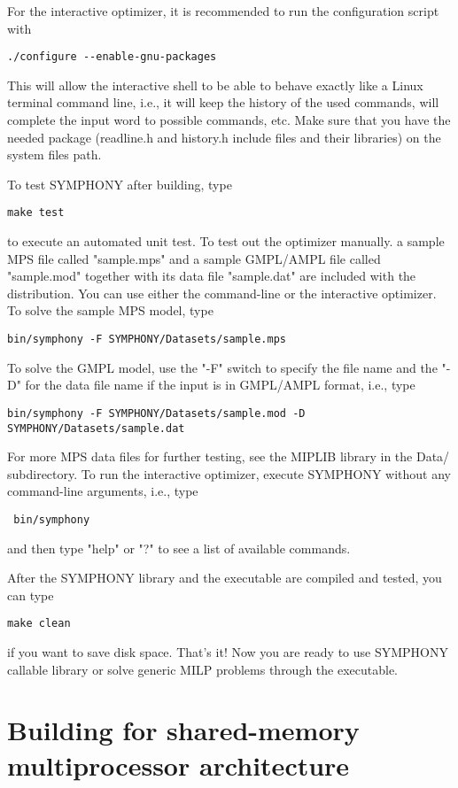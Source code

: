 For the interactive optimizer, it is recommended to run the configuration 
script with 
\begin{verbatim}
./configure --enable-gnu-packages 
\end{verbatim}
This will allow the interactive shell to be able to behave exactly like 
a Linux terminal command line, i.e., it will keep the history of the used 
commands, will complete the input word to possible commands, etc. Make sure
that you have the needed package (readline.h and history.h include files 
and their libraries) on the system files path. 

To test SYMPHONY after building, type
\begin{verbatim}
make test
\end{verbatim}
to execute an automated unit test. To test out the optimizer manually. a
sample MPS file called "sample.mps" and a sample GMPL/AMPL file called
"sample.mod" together with its data file "sample.dat" are included with the
distribution. You can use either the command-line or the interactive
optimizer. To solve the sample MPS model, type 
\begin{verbatim}
bin/symphony -F SYMPHONY/Datasets/sample.mps
\end{verbatim}
To solve the GMPL model, use the "-F" switch to specify the file
name and the "-D" for the data file name if the input is in GMPL/AMPL format,
i.e., type
\begin{verbatim}
bin/symphony -F SYMPHONY/Datasets/sample.mod -D SYMPHONY/Datasets/sample.dat
\end{verbatim}
For more MPS data files for further testing, see the MIPLIB library in the
Data/ subdirectory. To run the interactive optimizer, execute SYMPHONY without
any command-line arguments, i.e., type
\begin{verbatim}
 bin/symphony 
\end{verbatim}
and then type "help" or "?" to see a list of available commands.

After the SYMPHONY library and the executable are compiled and tested, you
can type
\begin{verbatim}
make clean 
\end{verbatim}
if you want to save disk space. That's it! Now you are ready to use SYMPHONY
callable library or solve generic MILP problems through the executable.

\section{Building for shared-memory multiprocessor architecture}

